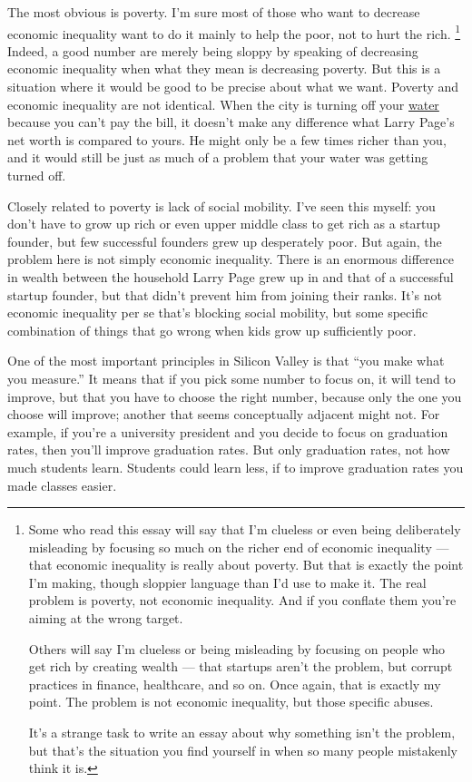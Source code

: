 The most obvious is poverty. I'm sure most of those who want to decrease
economic inequality want to do it mainly to help the poor, not to hurt
the rich. \footnote{Some who read this essay will say that I'm clueless or even
being deliberately misleading by focusing so much on the richer end of
economic inequality --- that economic inequality is really about
poverty. But that is exactly the point I'm making, though sloppier
language than I'd use to make it. The real problem is poverty, not
economic inequality. And if you conflate them you're aiming at the wrong
target.

Others will say I'm clueless or being misleading by focusing on people
who get rich by creating wealth --- that startups aren't the problem,
but corrupt practices in finance, healthcare, and so on. Once again,
that is exactly my point. The problem is not economic inequality, but
those specific abuses.

It's a strange task to write an essay about why something isn't the
problem, but that's the situation you find yourself in when so many
people mistakenly think it is.} Indeed, a good number are merely being
sloppy by speaking of decreasing economic inequality when what they mean
is decreasing poverty. But this is a situation where it would be good to
be precise about what we want. Poverty and economic inequality are not
identical. When the city is turning off your
\href{http://www.theatlantic.com/business/archive/2014/07/what-happens-when-detroit-shuts-off-the-water-of-100000-people/374548/}{water}
because you can't pay the bill, it doesn't make any difference what
Larry Page's net worth is compared to yours. He might only be a few
times richer than you, and it would still be just as much of a problem
that your water was getting turned off.

Closely related to poverty is lack of social mobility. I've seen this
myself: you don't have to grow up rich or even upper middle class to get
rich as a startup founder, but few successful founders grew up
desperately poor. But again, the problem here is not simply economic
inequality. There is an enormous difference in wealth between the
household Larry Page grew up in and that of a successful startup
founder, but that didn't prevent him from joining their ranks. It's not
economic inequality per se that's blocking social mobility, but some
specific combination of things that go wrong when kids grow up
sufficiently poor.

One of the most important principles in Silicon Valley is that ``you
make what you measure.'' It means that if you pick some number to focus
on, it will tend to improve, but that you have to choose the right
number, because only the one you choose will improve; another that seems
conceptually adjacent might not. For example, if you're a university
president and you decide to focus on graduation rates, then you'll
improve graduation rates. But only graduation rates, not how much
students learn. Students could learn less, if to improve graduation
rates you made classes easier.

